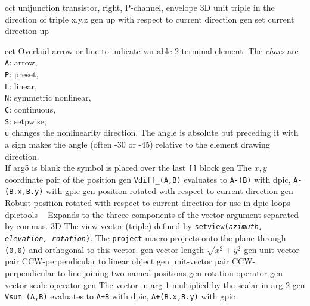 %
  {cct}%
  {unijunction transistor, right, P-channel, envelope
    }%
%
  {3D} {unit triple in the direction of triple x,y,z}%
%
  {gen}%
  {up with respect to current direction}%
%
  {gen}%
  {set current direction up }%

%

%
  {cct}%
  {Overlaid arrow or line to indicate variable 2-terminal element:
    The {\sl chars} are\\
    {\tt A}: arrow,\\
    {\tt P}: preset,\\
    {\tt L}: linear,\\
    {\tt N}:  symmetric nonlinear,\\
    {\tt C}: continuous,\\
    {\tt S}: setpwise;\\
    {\tt u} changes the nonlinearity direction.  The angle is absolute
    but preceding it with a sign makes the angle (often -30 or -45)
    relative to the element drawing direction.\\
    If arg5 is blank the symbol is placed over the last {\tt []} block
   }%
%
  {gen}%
  {The $x, y$ coordinate pair of the position}%
%
  {gen}%
  {{\tt Vdiff\_(A,B)} evaluates to {\tt A-(B)} with dpic, {\tt A-(B.x,B.y)}
   with gpic}%
%
  {gen}%
  {position rotated with respect to current direction}%
%
  {gen}%
  {Robust position rotated with respect to current direction for use in
   dpic loops}%
%
  {dpictools}%
  {$\;\;$ Expands to the threee components of the vector argument separated
    by commas.}%
%
  {3D} {The view vector (triple) defined by {\tt setview({\sl azimuth,
   elevation, rotation})}. The {\tt project} macro projects onto the plane
   through {\tt (0,0)} and orthogonal to this vector.}%
%
  {gen}%
  {vector length $\sqrt{x^2+y^2}$}%
%
  {gen}%
  {unit-vector pair CCW-perpendicular to linear object}%
%
  {gen}%
  {unit-vector pair CCW-perpendicular to line joining two named positions}%
%
  {gen}%
  {rotation operator}%
%
  {gen}%
  {vector scale operator}%
%
  {gen}%
  {The vector in arg 1 multiplied by the scalar in arg 2}%
%
  {gen}%
  {{\tt Vsum\_(A,B)} evaluates to {\tt A+B} with dpic, {\tt A+(B.x,B.y)}
   with gpic}%

